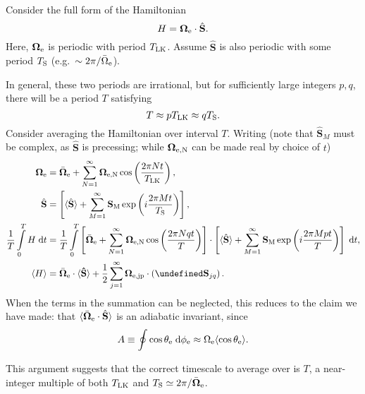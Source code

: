 \documentclass[11pt,
        usenames, %
        dvipsnames %
    ]{article}
\newcommand*{\bm}[1]{\boldsymbol{\mathbf{#1}}}
\newcommand*{\uv}[1]{\hat{\bm{#1}}}
\newcommand*{\ev}[1]{\langle#1\rangle}
\newcommand*{\p}[1]{\left(#1\right)}
\newcommand*{\s}[1]{\left[#1\right]}
\let\Re\undefined
\DeclareMathOperator{\Re}{Re}
\begin{document}
Consider the full form of the Hamiltonian
\begin{equation}
    H = \bm{\Omega}_{\rm e} \cdot \uv{S}.
\end{equation}
Here, $\bm{\Omega}_{\rm e}$ is periodic with period $T_{\rm LK}$. Assume
$\uv{S}$ is also periodic with some period $T_{\rm S}$ (e.g.\ $\sim 2\pi /
\bar{\Omega}_{\rm e}$).

In general, these two periods are irrational, but for sufficiently large
integers $p, q$, there will be a period $T$ satisfying
\begin{equation}
    T \approx pT_{\rm LK} \approx q T_{\rm S}.
\end{equation}
Consider averaging the Hamiltonian over interval $T$. Writing (note that
$\uv{S}_M$ must be complex, as $\uv{S}$ is precessing; while $\bm{\Omega}_{\rm
e, N}$ can be made real by choice of $t$)
\begin{align}
    \bm{\Omega}_{\rm e} &= \bar{\bm{\Omega}}_{\rm e} + \sum\limits_{N = 1}^\infty
            \bm{\Omega}_{\rm e, N}\cos \p{\frac{2\pi N t}{T_{\rm LK}}},\\
    \uv{S} &= \s{\ev{\uv{S}} + \sum\limits_{M = 1}^\infty
            \bm{S}_{\rm M}\exp \p{i\frac{2\pi M t}{T_{\rm S}}}},\\
    \frac{1}{T}\int\limits_0^T H\;\mathrm{d}t
        &= \frac{1}{T}\int\limits_0^T
            \s{\bar{\bm{\Omega}}_{\rm e} + \sum\limits_{N = 1}^\infty
            \bm{\Omega}_{\rm e, N}\cos \p{\frac{2\pi N qt}{T}}}
            \cdot \s{\ev{\uv{S}} + \sum\limits_{M = 1}^\infty
            \bm{S}_{\rm M}\exp \p{i\frac{2\pi M pt}{T}}}\;\mathrm{d}t,\\
    \ev{H} &= \bar{\bm{\Omega}}_{\rm e} \cdot \ev{\bm{\uv{S}}}
            + \frac{1}{2}\sum\limits_{j = 1}^\infty
                \bm{\Omega}_{\rm e, jp} \cdot \left(\Re\bm{S}_{jq}\right).
                \label{eq:exp_h}
\end{align}
When the terms in the summation can be neglected, this reduces to the claim we
have made: that $\ev{\bar{\bm{\Omega}}_{\rm e} \cdot \uv{S}}$ is an adiabatic
invariant, since
\begin{equation}
    A \equiv \oint \cos \theta_{\rm e} \;\mathrm{d}\phi_{\rm e}
        \approx \Omega_{\rm e} \ev{\cos \theta_{\rm e}}.
\end{equation}

This argument suggests that the correct timescale to average over is $T$, a
near-integer multiple of both $T_{\rm LK}$ and $T_{\rm S} \simeq 2\pi /
\bar{\bm{\Omega}}_{\rm e}$.
\end{document}
